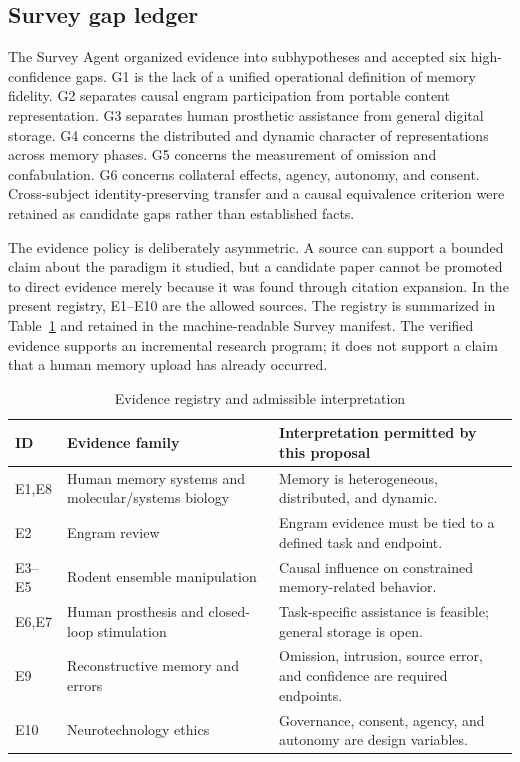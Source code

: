 \documentclass[conference]{IEEEtran}
\begin{document}
\subsection{Survey gap ledger}
The Survey Agent organized evidence into subhypotheses and accepted six high-confidence gaps. G1 is the lack of a unified operational definition of memory fidelity. G2 separates causal engram participation from portable content representation. G3 separates human prosthetic assistance from general digital storage. G4 concerns the distributed and dynamic character of representations across memory phases. G5 concerns the measurement of omission and confabulation. G6 concerns collateral effects, agency, autonomy, and consent. Cross-subject identity-preserving transfer and a causal equivalence criterion were retained as candidate gaps rather than established facts.

The evidence policy is deliberately asymmetric. A source can support a bounded claim about the paradigm it studied, but a candidate paper cannot be promoted to direct evidence merely because it was found through citation expansion. In the present registry, E1--E10 are the allowed sources. The registry is summarized in Table~\ref{tab:evidence} and retained in the machine-readable Survey manifest. The verified evidence supports an incremental research program; it does not support a claim that a human memory upload has already occurred.

\begin{table}[t]
\caption{Evidence registry and admissible interpretation}
\label{tab:evidence}
\centering
\footnotesize
\setlength{\tabcolsep}{2pt}
\begin{tabular}{p{}p{}p{}}
\toprule
ID & Evidence family & Interpretation permitted by this proposal \\
\midrule
E1,E8 & Human memory systems and molecular/systems biology & Memory is heterogeneous, distributed, and dynamic. \\
E2 & Engram review & Engram evidence must be tied to a defined task and endpoint. \\
E3--E5 & Rodent ensemble manipulation & Causal influence on constrained memory-related behavior. \\
E6,E7 & Human prosthesis and closed-loop stimulation & Task-specific assistance is feasible; general storage is open. \\
E9 & Reconstructive memory and errors & Omission, intrusion, source error, and confidence are required endpoints. \\
E10 & Neurotechnology ethics & Governance, consent, agency, and autonomy are design variables. \\
\bottomrule
\end{tabular}
\end{table}
\end{document}
